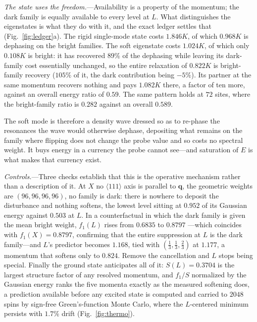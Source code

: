 \documentclass[
aps,prl,twocolumn,amsmath,amssymb,superscriptaddress,
longbibliography,floatfix
]{revtex4-2}
\newcommand{\bq}{\bm q}
\begin{document}
\emph{The state uses the freedom.}---Availability is a property of the
momentum; the dark family is equally available to every level at $L$. What
distinguishes the eigenstates is what they do with it, and the exact
ledger settles that (Fig.~\ref{fig:ledger}a). The rigid single-mode
state costs $1.846K$, of which $0.968K$ is dephasing on the bright
families. The soft eigenstate costs $1.024K$, of which only $0.108K$ is
bright: it has recovered $89\%$ of the dephasing while leaving its
dark-family cost essentially unchanged, so the entire relaxation of
$0.822K$ is bright-family recovery ($105\%$ of it, the dark contribution
being $-5\%$). Its partner at the same momentum recovers nothing and
pays $1.082K$ there, a factor of ten more, against an overall energy
ratio of $0.59$. The same pattern holds at $72$ sites, where the
bright-family ratio is $0.282$ against an overall $0.589$.

The soft mode is therefore a density wave dressed so as to re-phase the
resonances the wave would otherwise dephase, depositing what remains on
the family where flipping does not change the probe value and so costs no
spectral weight. It buys energy in a currency the probe cannot see---and
saturation of $E$ is what makes that currency exist.

\emph{Controls.}---Three checks establish that this is the operative
mechanism rather than a description of it. At $X$ no $\langle111\rangle$
axis is parallel to $\bq$, the geometric weights are $(96,96,96,96)$, no
family is dark: there is nowhere to deposit the disturbance and nothing
softens, the lowest level sitting at $0.952$ of its Gaussian energy
against $0.503$ at $L$. In a counterfactual in which the dark family is
given the mean bright weight, $f_1(L)$ rises from $0.6835$ to $0.8797$
---which coincides with $f_1(X)=0.8797$, confirming that the entire
suppression at $L$ is the dark family---and $L$'s predictor becomes
$1.168$, tied with $(\frac13,\frac13,\frac23)$ at $1.177$, a momentum
that softens only to $0.824$. Remove the cancellation and $L$ stops being
special. Finally the ground state anticipates all of it: $S(L)=0.3704$ is
the largest structure factor of any resolved momentum, and $f_1/S$
normalized by the Gaussian energy ranks the five momenta exactly as the
measured softening does, a prediction available before any excited state
is computed and carried to $2048$ spins by sign-free Green's-function
Monte Carlo, where the $L$-centered minimum persists with $1.7\%$ drift
(Fig.~\ref{fig:thermo}).
\end{document}
